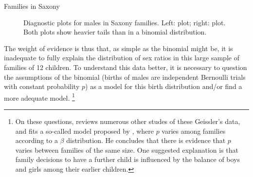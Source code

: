 \documentclass[11pt]{book}\usepackage[]{graphicx}\usepackage[]{color}
\newenvironment{knitrout}{}{} %
\renewenvironment{knitrout}{\small\renewcommand{\baselinestretch}{.85}}{} %
\begin{document}
\begin{Example}{Families in Saxony}
\begin{knitrout}
\begin{figure}[htbp]
\caption[Diagnostic plots for males in Saxony families]{Diagnostic plots for males in Saxony families. Left:  plot; right:  plot. Both plots show heavier tails than in a binomial distribution.\label{fig:distplot3}}
\end{figure}


\end{knitrout}

The weight of evidence is thus that, as simple as the binomial might be,
it is inadequate to fully explain the distribution of sex ratios in this
large sample of families of 12 children.
To understand this data better, it is necessary to question the assumptions
of the binomial (births of males are independent
Bernoulli trials with constant probability $p$)
as a model for this birth distribution and/or find a more
adequate model.%
\footnote{
On these questions, \citet{Edwards:1958} reviews
numerous other studes of these Geissler's data, and fits a so-called
 model proposed by \citet{Skellam:1948},
where $p$ varies among families according to a $\beta$ distribution.
He concludes that there
is evidence that $p$ varies between families of the same size.  One suggested
explanation is that family decisions to have a further child is influenced by
the balance of boys and girls among their earlier children.
}
\end{Example}
\end{document}
